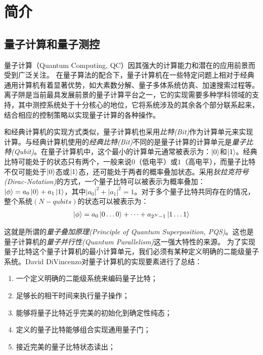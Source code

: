 
\chapter[简介]{简介\label{section:introduction}}
\section[离子量子计算和量子测控]{量子计算和量子测控}
量子计算（Quantum Computing, QC）因其强大的计算能力和潜在的应用前景而受到广泛关注。
在量子算法的配合下，量子计算机在一些特定问题上相对于经典通用计算机有着显著优势，如大素数分解\cite[]{Shor_1997, Singleton_Jr_2023}、量子多体系统仿真\cite[]{Feynman_1982, Lloyd_1996}、加速搜索过程\cite[]{Grover_2002}等。
离子阱是当前最具发展前景的量子计算平台之一，它的实现需要多种学科领域的支持，其中测控系统处于十分核心的地位，它将系统涉及的其余各个部分联系起来，
结合相应的控制策略以实现量子计算的各种操作。



和经典计算机的实现方式类似，量子计算机也采用\emph{比特(Bit)}作为计算单元来实现计算。与经典计算机使用的\emph{经典比特(Bit)}不同的是量子计算的计算单元是\emph{量子比特(Qubit)}。在量子计算机中，这个最小的计算单元通常被表示为：$\ket{0}$和$\ket{1}$。经典比特可能处于的状态只有两个，一般来说$0$（低电平）或$1$（高电平），而量子比特不仅可能处于$\ket{0}$态或$\ket{1}$态，还可能处于两者的概率叠加状态。采用\emph{狄拉克符号(Dirac-Notation)}的方式，一个量子比特可以被表示为概率叠加：$\ket{\phi}=a_0\ket{0}+a_1\ket{1}$，其中$|a_0|^2+|a_1|^2=1$。对于多个量子比特共同存在的情况，整个系统$(N-qubits)$的状态可以被表示为：
\begin{align}
    \ket{\phi}=a_0\ket{0\dots0}+\dots+a_{2^N-1}\ket{1\dots1}\nonumber
\end{align}

这就是所谓的\emph{量子叠加原理(Principle of Quantum Superposition, PQS)}\cite[]{Fedorov_Manko_2019}。这也是量子计算机的\emph{量子并行性(Quantum Parallelism)}这一强大特性的来源。
为了实现量子比特这个量子计算机的最小计算单元，我们必须有某种定义明确的二能级量子系统。David DiVincenzo对量子计算机的实现要素进行了总结\cite[]{DiVincenzo_2000}：
\begin{enumerate}
    \item 一个定义明确的二能级系统来编码量子比特；
    \item 足够长的相干时间来执行量子操作；
    \item 能够将量子比特近乎完美的初始化到确定性纯态；
    \item 定义的量子比特能够组合实现通用量子门；
    \item 接近完美的量子比特状态读出；
\end{enumerate}

